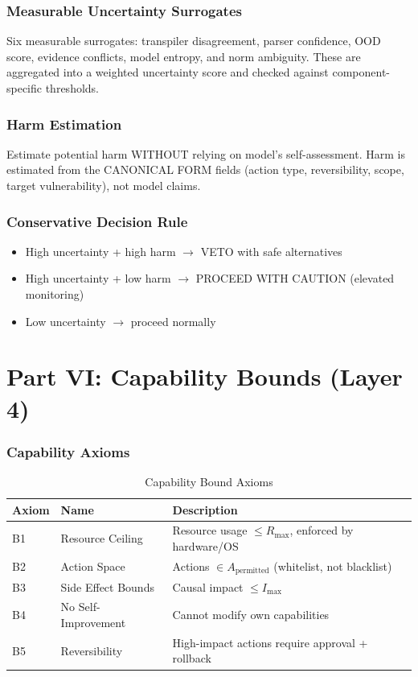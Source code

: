 \documentclass[11pt,letterpaper]{article}
\theoremstyle{definition}
\theoremstyle{remark}
\begin{document}
\section{Measurable Uncertainty Surrogates}

Six measurable surrogates: transpiler disagreement, parser confidence, OOD score, evidence conflicts, model entropy, and norm ambiguity. These are aggregated into a weighted uncertainty score and checked against component-specific thresholds.

\section{Harm Estimation}

Estimate potential harm WITHOUT relying on model's self-assessment. Harm is estimated from the CANONICAL FORM fields (action type, reversibility, scope, target vulnerability), not model claims.

\section{Conservative Decision Rule}

\begin{itemize}
\item High uncertainty + high harm $\to$ VETO with safe alternatives
\item High uncertainty + low harm $\to$ PROCEED WITH CAUTION (elevated monitoring)
\item Low uncertainty $\to$ proceed normally
\end{itemize}



\part*{Part VI: Capability Bounds (Layer 4)}

\section{Capability Axioms}

\begin{table}[h]
\centering
\begin{tabular}{@{}lll@{}}
\toprule
\textbf{Axiom} & \textbf{Name} & \textbf{Description} \\
\midrule
B1 & Resource Ceiling & Resource usage $\leq R_{\max}$, enforced by hardware/OS \\
B2 & Action Space & Actions $\in A_{\text{permitted}}$ (whitelist, not blacklist) \\
B3 & Side Effect Bounds & Causal impact $\leq I_{\max}$ \\
B4 & No Self-Improvement & Cannot modify own capabilities \\
B5 & Reversibility & High-impact actions require approval + rollback \\
\bottomrule
\end{tabular}
\caption{Capability Bound Axioms}
\end{table}
\end{document}
